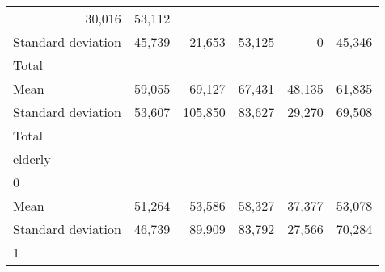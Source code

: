 \begin{tabular}{llllll}
  \multicolumn{1}{r}{30,016} &
  \multicolumn{1}{r}{53,112} \\
\multicolumn{1}{l}{\hspace{4em}Standard deviation} &
  \multicolumn{1}{|r}{45,739} &
  \multicolumn{1}{r}{21,653} &
  \multicolumn{1}{r}{53,125} &
  \multicolumn{1}{r}{0} &
  \multicolumn{1}{r}{45,346} \\
\multicolumn{1}{l}{\hspace{3em}Total} &
  \multicolumn{1}{|r}{} &
  \multicolumn{1}{r}{} &
  \multicolumn{1}{r}{} &
  \multicolumn{1}{r}{} &
  \multicolumn{1}{r}{} \\
\multicolumn{1}{l}{\hspace{4em}Mean} &
  \multicolumn{1}{|r}{59,055} &
  \multicolumn{1}{r}{69,127} &
  \multicolumn{1}{r}{67,431} &
  \multicolumn{1}{r}{48,135} &
  \multicolumn{1}{r}{61,835} \\
\multicolumn{1}{l}{\hspace{4em}Standard deviation} &
  \multicolumn{1}{|r}{53,607} &
  \multicolumn{1}{r}{105,850} &
  \multicolumn{1}{r}{83,627} &
  \multicolumn{1}{r}{29,270} &
  \multicolumn{1}{r}{69,508} \\
\multicolumn{1}{l}{\hspace{1em}Total} &
  \multicolumn{1}{|r}{} &
  \multicolumn{1}{r}{} &
  \multicolumn{1}{r}{} &
  \multicolumn{1}{r}{} &
  \multicolumn{1}{r}{} \\
\multicolumn{1}{l}{\hspace{2em}elderly} &
  \multicolumn{1}{|r}{} &
  \multicolumn{1}{r}{} &
  \multicolumn{1}{r}{} &
  \multicolumn{1}{r}{} &
  \multicolumn{1}{r}{} \\
\multicolumn{1}{l}{\hspace{3em}0} &
  \multicolumn{1}{|r}{} &
  \multicolumn{1}{r}{} &
  \multicolumn{1}{r}{} &
  \multicolumn{1}{r}{} &
  \multicolumn{1}{r}{} \\
\multicolumn{1}{l}{\hspace{4em}Mean} &
  \multicolumn{1}{|r}{51,264} &
  \multicolumn{1}{r}{53,586} &
  \multicolumn{1}{r}{58,327} &
  \multicolumn{1}{r}{37,377} &
  \multicolumn{1}{r}{53,078} \\
\multicolumn{1}{l}{\hspace{4em}Standard deviation} &
  \multicolumn{1}{|r}{46,739} &
  \multicolumn{1}{r}{89,909} &
  \multicolumn{1}{r}{83,792} &
  \multicolumn{1}{r}{27,566} &
  \multicolumn{1}{r}{70,284} \\
\multicolumn{1}{l}{\hspace{3em}1} &
  \multicolumn{1}{|r}{} &

\end{tabular}
